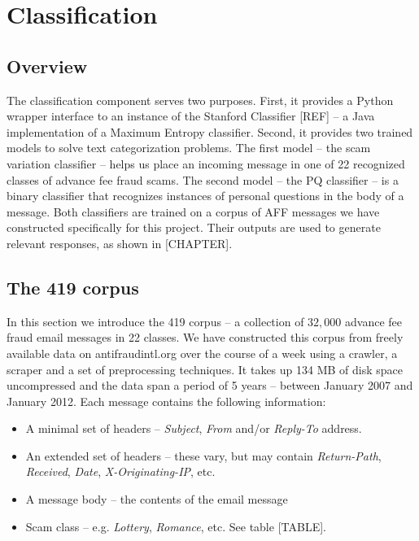 \chapter{Classification}


\section{Overview}
The classification component serves two purposes. First, it provides a Python wrapper interface to an instance of the Stanford Classifier [REF] -- a Java implementation of a Maximum Entropy classifier. Second, it provides two trained models to solve text categorization problems. The first model -- the scam variation classifier -- helps us place an incoming message in one of 22 recognized classes of advance fee fraud scams. The second model -- the PQ classifier -- is a binary classifier that recognizes instances of personal questions in the body of a message. Both classifiers are trained on a corpus of AFF messages we have constructed specifically for this project. Their outputs are used to generate relevant responses, as shown in [CHAPTER].

\section{The 419 corpus}
In this section we introduce the 419 corpus -- a collection of $32,000$ advance fee fraud email messages in 22 classes. We have constructed this corpus from freely available data on antifraudintl.org over the course of a week using a crawler, a scraper and a set of preprocessing techniques. It takes up 134 MB of disk space uncompressed and the data span a period of 5 years -- between January 2007 and January 2012.  Each message contains the following information:
\begin{itemize}
	\item A minimal set of headers -- \emph{Subject}, \emph{From} and/or \emph{Reply-To} address.
	\item An extended set of headers -- these vary, but may contain \emph{Return-Path}, \emph{Received}, \emph{Date}, \emph{X-Originating-IP}, etc.
	\item A message body -- the contents of the email message
	\item Scam class -- e.g. \emph{Lottery}, \emph{Romance}, etc. See table [TABLE].
\end{itemize}

